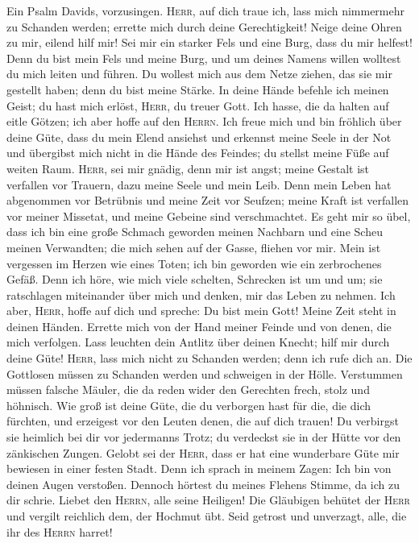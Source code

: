 Ein Psalm Davids, vorzusingen. 
\textsc{Herr}, auf dich traue ich, lass mich nimmermehr zu Schanden
werden; errette mich durch deine Gerechtigkeit!  Neige
deine Ohren zu mir, eilend hilf mir! Sei mir ein starker Fels und eine
Burg, dass du mir helfest!  Denn du bist mein Fels und
meine Burg, und um deines Namens willen wolltest du mich leiten und
führen.  Du wollest mich aus dem Netze ziehen, das sie mir
gestellt haben; denn du bist meine Stärke.  In deine Hände
befehle ich meinen Geist; du hast mich erlöst, \textsc{Herr}, du treuer
Gott.  Ich hasse, die da halten auf eitle Götzen; ich aber
hoffe auf den \textsc{Herrn}.  Ich freue mich und bin
fröhlich über deine Güte, dass du mein Elend ansiehst und erkennst meine
Seele in der Not  und übergibst mich nicht in die Hände
des Feindes; du stellst meine Füße auf weiten Raum. 
\textsc{Herr}, sei mir gnädig, denn mir ist angst; meine Gestalt ist
verfallen vor Trauern, dazu meine Seele und mein Leib. 
Denn mein Leben hat abgenommen vor Betrübnis und meine Zeit vor Seufzen;
meine Kraft ist verfallen vor meiner Missetat, und meine Gebeine sind
verschmachtet.  Es geht mir so übel, dass ich bin eine
große Schmach geworden meinen Nachbarn und eine Scheu meinen Verwandten;
die mich sehen auf der Gasse, fliehen vor mir.  Mein ist
vergessen im Herzen wie eines Toten; ich bin geworden wie ein
zerbrochenes Gefäß.  Denn ich höre, wie mich viele
schelten, Schrecken ist um und um; sie ratschlagen miteinander über mich
und denken, mir das Leben zu nehmen.  Ich aber,
\textsc{Herr}, hoffe auf dich und spreche: Du bist mein Gott!
 Meine Zeit steht in deinen Händen. Errette mich von der
Hand meiner Feinde und von denen, die mich verfolgen. 
Lass leuchten dein Antlitz über deinen Knecht; hilf mir durch deine
Güte!  \textsc{Herr}, lass mich nicht zu Schanden werden;
denn ich rufe dich an. Die Gottlosen müssen zu Schanden werden und
schweigen in der Hölle.  Verstummen müssen falsche
Mäuler, die da reden wider den Gerechten frech, stolz und höhnisch.
 Wie groß ist deine Güte, die du verborgen hast für die,
die dich fürchten, und erzeigest vor den Leuten denen, die auf dich
trauen!  Du verbirgst sie heimlich bei dir vor jedermanns
Trotz; du verdeckst sie in der Hütte vor den zänkischen Zungen.
 Gelobt sei der \textsc{Herr}, dass er hat eine
wunderbare Güte mir bewiesen in einer festen Stadt.  Denn
ich sprach in meinem Zagen: Ich bin von deinen Augen verstoßen. Dennoch
hörtest du meines Flehens Stimme, da ich zu dir schrie. 
Liebet den \textsc{Herrn}, alle seine Heiligen! Die Gläubigen behütet
der \textsc{Herr} und vergilt reichlich dem, der Hochmut übt.
 Seid getrost und unverzagt, alle, die ihr des
\textsc{Herrn} harret!

